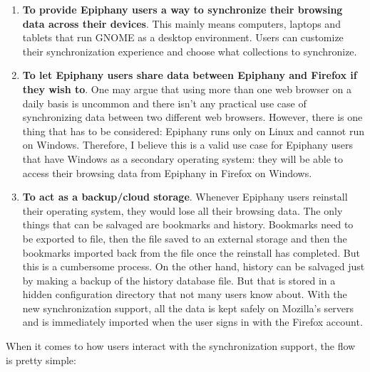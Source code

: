 \begin{enumerate}
  \item \textbf{To provide Epiphany users a way to synchronize their browsing data across their devices}. This mainly means computers, laptops and tablets that run GNOME as a desktop environment. Users can customize their synchronization experience and choose what collections to synchronize.

  \item \textbf{To let Epiphany users share data between Epiphany and Firefox if they wish to}. One may argue that using more than one web browser on a daily basis is uncommon and there isn't any practical use case of synchronizing data between two different web browsers. However, there is one thing that has to be considered: Epiphany runs only on Linux and cannot run on Windows. Therefore, I believe this is a valid use case for Epiphany users that have Windows as a secondary operating system: they will be able to access their browsing data from Epiphany in Firefox on Windows.

  \item \textbf{To act as a backup/cloud storage}. Whenever Epiphany users reinstall their operating system, they would lose all their browsing data. The only things that can be salvaged are bookmarks and history. Bookmarks need to be exported to file, then the file saved to an external storage and then the bookmarks imported back from the file once the reinstall has completed. But this is a cumbersome process. On the other hand, history can be salvaged just by making a backup of the history database file. But that is stored in a hidden configuration directory that not many users know about. With the new synchronization support, all the data is kept safely on Mozilla's servers and is immediately imported when the user signs in with the Firefox account.
\end{enumerate}

When it comes to how users interact with the synchronization support, the flow is pretty simple:

